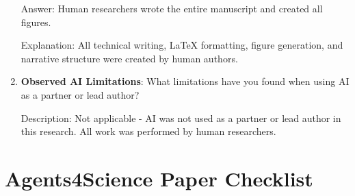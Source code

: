 \documentclass{article}
\begin{document}
\begin{enumerate}
    Answer: \involvementA{} Human researchers wrote the entire manuscript and created all figures.
    
    Explanation: All technical writing, LaTeX formatting, figure generation, and narrative structure were created by human authors.

    \item \textbf{Observed AI Limitations}: What limitations have you found when using AI as a partner or lead author? 

    Description: Not applicable - AI was not used as a partner or lead author in this research. All work was performed by human researchers.
\end{enumerate}

\newpage

\section*{Agents4Science Paper Checklist}
\end{document}
